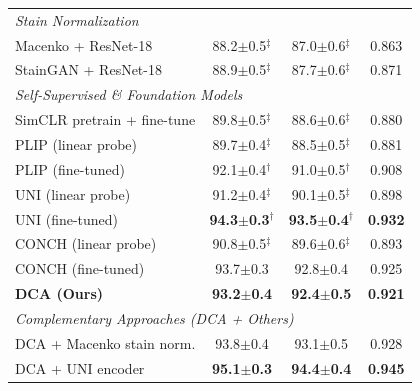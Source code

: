 \documentclass[pdflatex,sn-nature]{sn-jnl}%
\theoremstyle{thmstyleone}%
\theoremstyle{thmstyletwo}%
\theoremstyle{thmstylethree}%
\begin{document}
\begin{table}[t]
\begin{tabularx}{\textwidth}{Xccc}
\hline
\multicolumn{4}{l}{\textit{Stain Normalization}} \\
Macenko + ResNet-18 & 88.2$\pm$0.5$^\ddagger$ & 87.0$\pm$0.6$^\ddagger$ & 0.863 \\
StainGAN + ResNet-18 & 88.9$\pm$0.5$^\ddagger$ & 87.7$\pm$0.6$^\ddagger$ & 0.871 \\
\hline
\multicolumn{4}{l}{\textit{Self-Supervised \& Foundation Models}} \\
SimCLR pretrain + fine-tune & 89.8$\pm$0.5$^\ddagger$ & 88.6$\pm$0.6$^\ddagger$ & 0.880 \\
PLIP (linear probe) & 89.7$\pm$0.4$^\ddagger$ & 88.5$\pm$0.5$^\ddagger$ & 0.881 \\
PLIP (fine-tuned) & 92.1$\pm$0.4$^\dagger$ & 91.0$\pm$0.5$^\dagger$ & 0.908 \\
UNI (linear probe) & 91.2$\pm$0.4$^\ddagger$ & 90.1$\pm$0.5$^\ddagger$ & 0.898 \\
UNI (fine-tuned) & \textbf{94.3$\pm$0.3}$^\dagger$ & \textbf{93.5$\pm$0.4}$^\dagger$ & \textbf{0.932} \\
CONCH (linear probe) & 90.8$\pm$0.5$^\ddagger$ & 89.6$\pm$0.6$^\ddagger$ & 0.893 \\
CONCH (fine-tuned) & 93.7$\pm$0.3 & 92.8$\pm$0.4 & 0.925 \\
\hline
\textbf{DCA (Ours)} & \textbf{93.2$\pm$0.4} & \textbf{92.4$\pm$0.5} & \textbf{0.921} \\
\hline
\multicolumn{4}{l}{\textit{Complementary Approaches (DCA + Others)}} \\
DCA + Macenko stain norm. & 93.8$\pm$0.4 & 93.1$\pm$0.5 & 0.928 \\
DCA + UNI encoder & \textbf{95.1$\pm$0.3} & \textbf{94.4$\pm$0.4} & \textbf{0.945} \\
\hline
\end{tabularx}
\end{table}
\end{document}
